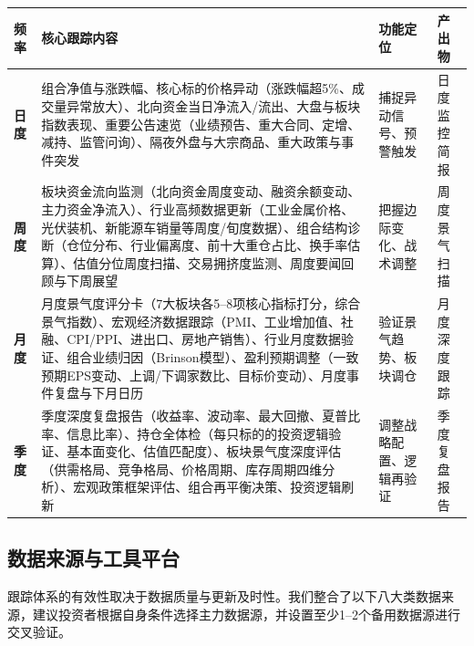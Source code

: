 \begin{exhibitbox}[表9-2：四级跟踪频率与核心内容]
\scriptsize
\setlength{\tabcolsep}{3pt}
\renewcommand{\arraystretch}{1.15}
\begin{tabularx}{\textwidth}{l X l l}
\toprule
\textbf{频率} & \textbf{核心跟踪内容} & \textbf{功能定位} & \textbf{产出物} \\
\midrule
\rowcolor{riskred!8}
\textbf{日度} & 组合净值与涨跌幅、核心标的价格异动（涨跌幅超5\%、成交量异常放大）、北向资金当日净流入/流出、大盘与板块指数表现、重要公告速览（业绩预告、重大合同、定增、减持、监管问询）、隔夜外盘与大宗商品、重大政策与事件突发 & 捕捉异动信号、预警触发 & 日度监控简报 \\
\midrule
\rowcolor{riskamber!8}
\textbf{周度} & 板块资金流向监测（北向资金周度变动、融资余额变动、主力资金净流入）、行业高频数据更新（工业金属价格、光伏装机、新能源车销量等周度/旬度数据）、组合结构诊断（仓位分布、行业偏离度、前十大重仓占比、换手率估算）、估值分位周度扫描、交易拥挤度监测、周度要闻回顾与下周展望 & 把握边际变化、战术调整 & 周度景气扫描 \\
\midrule
\rowcolor{nvgreen!8}
\textbf{月度} & 月度景气度评分卡（7大板块各5--8项核心指标打分，综合景气指数）、宏观经济数据跟踪（PMI、工业增加值、社融、CPI/PPI、进出口、房地产销售）、行业月度数据验证、组合业绩归因（Brinson模型）、盈利预期调整（一致预期EPS变动、上调/下调家数比、目标价变动）、月度事件复盘与下月日历 & 验证景气趋势、板块调仓 & 月度深度跟踪 \\
\midrule
\rowcolor{navy!8}
\textbf{季度} & 季度深度复盘报告（收益率、波动率、最大回撤、夏普比率、信息比率）、持仓全体检（每只标的的投资逻辑验证、基本面变化、估值匹配度）、板块景气度深度评估（供需格局、竞争格局、价格周期、库存周期四维分析）、宏观政策框架评估、组合再平衡决策、投资逻辑刷新 & 调整战略配置、逻辑再验证 & 季度复盘报告 \\
\bottomrule
\end{tabularx}
\end{exhibitbox}

\subsection{数据来源与工具平台}

跟踪体系的有效性取决于数据质量与更新及时性。我们整合了以下八大类数据来源，建议投资者根据自身条件选择主力数据源，并设置至少1--2个备用数据源进行交叉验证。

